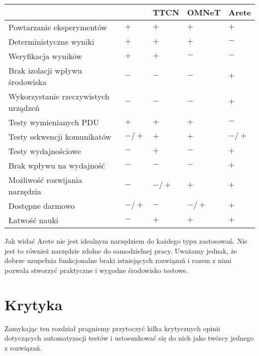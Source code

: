 \documentclass[00-praca-magisterska.tex]{subfiles}
\begin{document}
\begin{small}
\begin{center}
   \begin{tabular}{ l || C{1.6cm} | C{1.6cm} | C{1.6cm} | C{1.6cm}   }
      \hline
      & \small{\parbox[top][3.4em][c]{1.6cm}{}} & \small{TTCN} & \small{OMNeT} & \small{Arete} \\
      \hline
      Powtarzanie eksperymentów & $+$ & $+$ & $+$ & $+$ \\
      \hline
      Deterministyczne wyniki & $+$ & $+$ & $+$ & $-$ \\
      \hline
      Weryfikacja wyników & $+$ & $+$ & $-$ & $-$ \\
      \hline
      Brak izolacji wpływu środowiska & $-$ & $-$ & $-$ & $+$ \\
      \hline
      Wykorzystanie rzeczywistych urządzeń & $-$ & $-$ & $-$ & $+$ \\
      \hline
      Testy wymienianych PDU & $+$ & $+$ & $+$ & $-$ \\
      \hline
      Testy sekwencji komunikatów & $-/+$ & $+$ & $+$ & $-/+$ \\
      \hline
      Testy wydajnościowe & $-$ & $+$ & $-$ & $+$ \\
      \hline
      Brak wpływu na wydajność & $-$ & $-$ & $-$ & $+$ \\
      \hline
      Możliwość rozwijania narzędzia & $-$ & $-/+$ & $+$ & $+$ \\
      \hline
      Dostępne darmowo & $-/+$ & $-$ & $-/+$ & $+$ \\
      \hline
      Łatwość nauki & $-$ &  $+$ & $+$ & $+$ \\
      \hline

  \end{tabular}
\end{center}
\end{small}

Jak widać Arete nie jest idealnym narzędziem do każdego typu zastosowań. Nie
jest to również narzędzie zdolne do samodzielnej pracy.  Uważamy jednak, że
dobrze uzupełnia funkcjonalne braki istniejących rozwiązań i razem z nimi
pozwala stworzyć praktyczne i wygodne środowisko testowe.

\section{Krytyka}

Zamykając ten rozdział pragniemy przytoczyć kilka krytycznych opinii
dotyczących automatyzacji testów i ustosunkować się do nich jako twórcy jednego
z rozwiązań.
\end{document}
